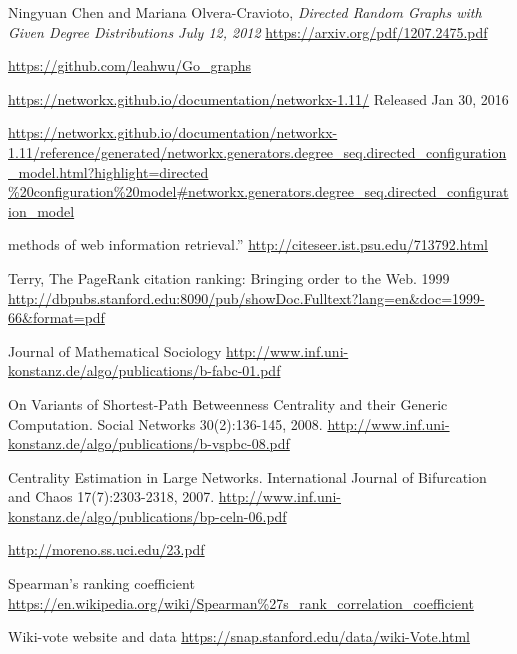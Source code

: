 \documentclass{article}
\begin{document}
\begin{thebibliography}{1}

   Ningyuan Chen and Mariana Olvera-Cravioto,
   \emph{ Directed Random Graphs with
Given Degree Distributions July 12, 2012
 } 
\url{https://arxiv.org/pdf/1207.2475.pdf}
 
 \url{https://github.com/leahwu/Go_graphs}
 
 
  \url{https://networkx.github.io/documentation/networkx-1.11/} 
  Released Jan 30, 2016
 
  \url{https://networkx.github.io/documentation/networkx-1.11/reference/generated/networkx.generators.degree_seq.directed_configuration_model.html?highlight=directed
  
 methods of web information retrieval.”
\url{ http://citeseer.ist.psu.edu/713792.html}  

 Terry, The PageRank citation ranking: Bringing order to the Web. 1999
\url{http://dbpubs.stanford.edu:8090/pub/showDoc.Fulltext?lang=en&doc=1999-66&format=pdf}

 Journal of Mathematical Sociology 
\url{http://www.inf.uni-konstanz.de/algo/publications/b-fabc-01.pdf}

On Variants of Shortest-Path Betweenness Centrality and their Generic Computation. Social Networks 30(2):136-145, 2008.
\url{http://www.inf.uni-konstanz.de/algo/publications/b-vspbc-08.pdf}

 Centrality Estimation in Large Networks. International Journal of Bifurcation and Chaos 17(7):2303-2318, 2007.
\url{http://www.inf.uni-konstanz.de/algo/publications/bp-celn-06.pdf}

\url{http://moreno.ss.uci.edu/23.pdf}
  
  Spearman's ranking coefficient
  \url{https://en.wikipedia.org/wiki/Spearman%27s_rank_correlation_coefficient}
  
  Wiki-vote website and data
\url{https://snap.stanford.edu/data/wiki-Vote.html}

  \end{thebibliography}
\end{document}
